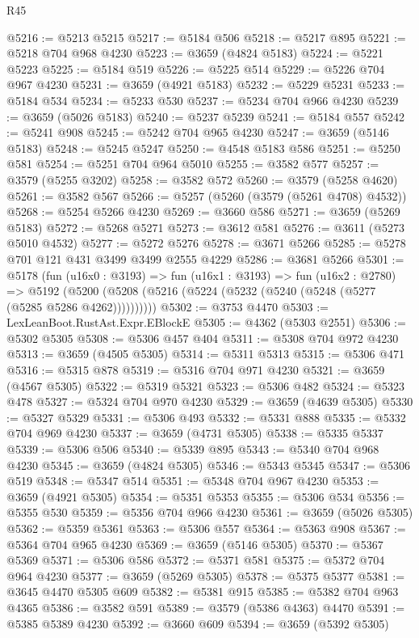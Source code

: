 \begin{lexlean}{R45}
\begin{coremodule}
@5216 := @5213 @5215
@5217 := @5184 @506
@5218 := @5217 @895
@5221 := @5218 @704 @968 @4230
@5223 := @3659 (@4824 @5183)
@5224 := @5221 @5223
@5225 := @5184 @519
@5226 := @5225 @514
@5229 := @5226 @704 @967 @4230
@5231 := @3659 (@4921 @5183)
@5232 := @5229 @5231
@5233 := @5184 @534
@5234 := @5233 @530
@5237 := @5234 @704 @966 @4230
@5239 := @3659 (@5026 @5183)
@5240 := @5237 @5239
@5241 := @5184 @557
@5242 := @5241 @908
@5245 := @5242 @704 @965 @4230
@5247 := @3659 (@5146 @5183)
@5248 := @5245 @5247
@5250 := @4548 @5183 @586
@5251 := @5250 @581
@5254 := @5251 @704 @964 @5010
@5255 := @3582 @577
@5257 := @3579 (@5255 @3202)
@5258 := @3582 @572
@5260 := @3579 (@5258 @4620)
@5261 := @3582 @567
@5266 := @5257 (@5260 (@3579 (@5261 @4708) @4532))
@5268 := @5254 @5266 @4230
@5269 := @3660 @586
@5271 := @3659 (@5269 @5183)
@5272 := @5268 @5271
@5273 := @3612 @581
@5276 := @3611 (@5273 @5010 @4532)
@5277 := @5272 @5276
@5278 := @3671 @5266
@5285 := @5278 @701 @121 @431 @3499 @3499 @2555 @4229
@5286 := @3681 @5266
@5301 := @5178
    (fun (u16x0 : @3193) =>
    fun (u16x1 : @3193) =>
    fun (u16x2 : @2780) =>
    @5192 (@5200 (@5208 (@5216 (@5224 (@5232 (@5240 (@5248 (@5277 (@5285 @5286 @4262))))))))))
@5302 := @3753 @4470
@5303 := LexLeanBoot.RustAst.Expr.EBlockE
@5305 := @4362 (@5303 @2551)
@5306 := @5302 @5305
@5308 := @5306 @457 @404
@5311 := @5308 @704 @972 @4230
@5313 := @3659 (@4505 @5305)
@5314 := @5311 @5313
@5315 := @5306 @471
@5316 := @5315 @878
@5319 := @5316 @704 @971 @4230
@5321 := @3659 (@4567 @5305)
@5322 := @5319 @5321
@5323 := @5306 @482
@5324 := @5323 @478
@5327 := @5324 @704 @970 @4230
@5329 := @3659 (@4639 @5305)
@5330 := @5327 @5329
@5331 := @5306 @493
@5332 := @5331 @888
@5335 := @5332 @704 @969 @4230
@5337 := @3659 (@4731 @5305)
@5338 := @5335 @5337
@5339 := @5306 @506
@5340 := @5339 @895
@5343 := @5340 @704 @968 @4230
@5345 := @3659 (@4824 @5305)
@5346 := @5343 @5345
@5347 := @5306 @519
@5348 := @5347 @514
@5351 := @5348 @704 @967 @4230
@5353 := @3659 (@4921 @5305)
@5354 := @5351 @5353
@5355 := @5306 @534
@5356 := @5355 @530
@5359 := @5356 @704 @966 @4230
@5361 := @3659 (@5026 @5305)
@5362 := @5359 @5361
@5363 := @5306 @557
@5364 := @5363 @908
@5367 := @5364 @704 @965 @4230
@5369 := @3659 (@5146 @5305)
@5370 := @5367 @5369
@5371 := @5306 @586
@5372 := @5371 @581
@5375 := @5372 @704 @964 @4230
@5377 := @3659 (@5269 @5305)
@5378 := @5375 @5377
@5381 := @3645 @4470 @5305 @609
@5382 := @5381 @915
@5385 := @5382 @704 @963 @4365
@5386 := @3582 @591
@5389 := @3579 (@5386 @4363) @4470
@5391 := @5385 @5389 @4230
@5392 := @3660 @609
@5394 := @3659 (@5392 @5305)

\end{coremodule}
\end{lexlean}
